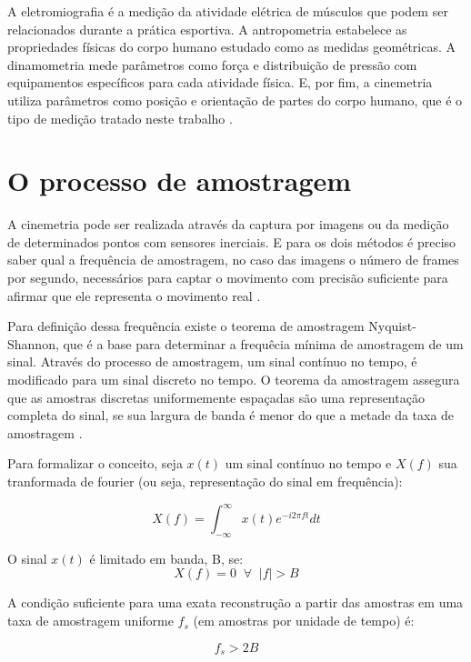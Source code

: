 A eletromiografia é a medição da atividade elétrica de músculos que podem ser relacionados durante a prática esportiva. A antropometria estabelece as propriedades físicas do corpo humano estudado como as medidas geométricas. A dinamometria mede parâmetros como força e distribuição de pressão com equipamentos específicos para cada atividade física. E, por fim, a cinemetria utiliza parâmetros como posição e orientação de partes do corpo humano, que é o tipo de medição tratado neste trabalho \cite{amadio2007}\cite{medeiros2013}.

\section{O processo de amostragem}
 
A cinemetria pode ser realizada através da captura por imagens ou da medição de determinados pontos com sensores inerciais. E para os dois métodos é preciso saber qual a frequência de amostragem, no caso das imagens o número de frames por segundo, necessários para captar o movimento com precisão suficiente para afirmar que ele representa o movimento real \cite{amadio2007}.

Para definição dessa frequência existe o teorema de amostragem Nyquist-Shannon, que é a base para determinar a frequêcia mínima de amostragem de um sinal. Através do processo de amostragem, um sinal contínuo no tempo, é modificado para um sinal discreto no tempo. O teorema da amostragem assegura que as amostras discretas uniformemente espaçadas são uma representação completa do sinal, se sua largura de banda é menor do que a metade da taxa de amostragem \cite{madeiro2011}.  

Para formalizar o conceito, seja $ x(t) $ um sinal contínuo no tempo e $ X(f) $ sua tranformada de fourier (ou seja, representação do sinal em frequência):

\begin{equation}
 X(f) = \int^{\infty}_{-\infty} x(t)e^{-i2\pi ft}dt 
\end{equation}

O sinal $x(t)$ é limitado em banda, B, se:
\begin{equation}
X(f) = 0 \; \;\forall \; \; |f|>B
\end{equation}

A condição suficiente para uma exata reconstrução a partir das amostras em uma taxa de amostragem uniforme $ f_{s} $ (em amostras por unidade de tempo) é:

\begin{equation}
f_{s}>2B 
\end{equation}

